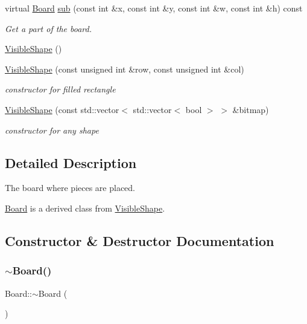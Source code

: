 \begin{DoxyCompactItemize}
virtual \mbox{\hyperlink{class_board}{Board}} \mbox{\hyperlink{class_board_aeff7b135ffeea47ce26da75ce670807a}{sub}} (const int \&x, const int \&y, const int \&w, const int \&h) const
\begin{DoxyCompactList}\small\item\em Get a part of the board. \end{DoxyCompactList}\item 
\mbox{\hyperlink{class_board_a280deeca2a39d227887ff2e13b009c0a}{Visible\+Shape}} ()
\item 
\mbox{\hyperlink{class_board_adc9d11f72af8b96fdb379330fd9de592}{Visible\+Shape}} (const unsigned int \&row, const unsigned int \&col)
\begin{DoxyCompactList}\small\item\em constructor for filled rectangle \end{DoxyCompactList}\item 
\mbox{\hyperlink{class_board_a0efa89e218acbaeaf4f2453467d54cc9}{Visible\+Shape}} (const std\+::vector$<$ std\+::vector$<$ bool $>$ $>$ \&bitmap)
\begin{DoxyCompactList}\small\item\em constructor for any shape \end{DoxyCompactList}\end{DoxyCompactItemize}


\subsection{Detailed Description}
The board where pieces are placed. 

\mbox{\hyperlink{class_board}{Board}} is a derived class from \mbox{\hyperlink{class_visible_shape}{Visible\+Shape}}. 

\subsection{Constructor \& Destructor Documentation}
\mbox{\label{class_board_af73f45730119a1fd8f6670f53f959e68}} 
\subsubsection{\texorpdfstring{$\sim$\+Board()}{~Board()}}
{\footnotesize\ttfamily Board\+::$\sim$\+Board (\begin{DoxyParamCaption}{ }\end{DoxyParamCaption})\hspace{0.3cm}{\ttfamily [virtual]}}



